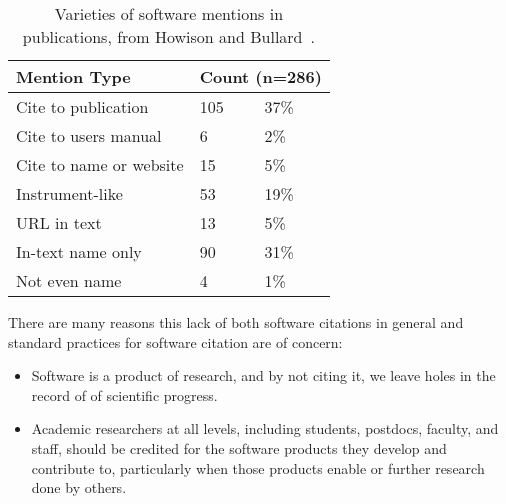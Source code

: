 \documentclass[11pt, oneside]{amsart}
\begin{document}
\begin{table}[htbp]
\caption{Varieties of software mentions in publications, from Howison and Bullard~\cite{howison2015jasist}.} 
\centering
\scriptsize\setlength{\tabcolsep}{2.5pt}
\begin{tabular}{@{}l l l } %
\toprule
Mention Type & \multicolumn{2}{c}{Count (n=286)} \\ %
\midrule
Cite to publication & 105 & 37\% \\ %
Cite to users manual & 6 & 2\% \\ %
Cite to name or website & 15 & 5\% \\ %
Instrument-like & 53 & 19\% \\ %
URL in text & 13 & 5\% \\ %
In-text name only & 90 & 31\% \\ %
Not even name & 4 & 1\% \\ %
\bottomrule
\end{tabular}
\label{tab:mentions}
\end{table}%

There are many reasons this lack of both software citations in general and standard practices
for software citation are of concern:
\begin{itemize}
\item Software is a product of research, and by not citing it, we leave holes in the record of of scientific progress.
\item Academic researchers at all levels, including students, postdocs, faculty, and staff, should be
credited for the software products they develop and contribute to, particularly when those products enable or further research done by others.
\end{itemize}
\end{document}
